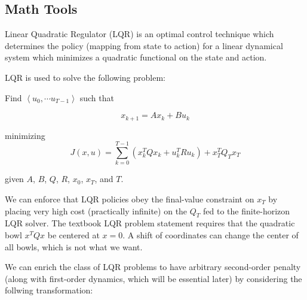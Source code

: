 \documentclass[letterpaper, 10pt, english, conference]{IEEEtran}
\begin{document}
\begin{comment}
\begin{center}
\begin{algorithm}
\For{$x_\mathrm{near} \in X_\mathrm{near}$} {
    $\sigma \leftarrow {\tt LQRSteer}(x_\mathrm{new}, x_\mathrm{near})$ \;
    \If{${\tt Cost}(x_\mathrm{new}) + {\tt Cost}(\sigma) < {\tt Cost}(x_\mathrm{near})$}{
        \If {${\tt CollisionFree}(\sigma)$}{   
            $x_\mathrm{parent} \leftarrow {\tt Parent}(x_\mathrm{near})$\;
            $E \leftarrow E \setminus \{ x_\mathrm{parent}, x_\mathrm{near}\}$\;
            $E \leftarrow E \cup \{ x_\mathrm{new}, x_\mathrm{near}\}$\;
}
    }
}
\Return{$(V,E)$}\;
\caption{${\tt Rewire}( \, (V,E), X_\mathrm{near}, x_\mathrm{new} \, )$}
\end{algorithm}
\end{center}

The changes to the primitives do not logically change the \rrtstar algorithm,
but instead make it easier to plug-in the contributed components.
\end{comment}

\subsection{Math Tools}

Linear Quadratic Regulator (LQR) is an optimal control technique which
determines the policy (mapping from state to action) for a linear
dynamical system which minimizes a quadratic functional on the state
and action.

LQR is used to solve the following problem: 

Find $\left\langle u_{0},\cdots u_{T-1}\right\rangle $ such that 

\[
x_{k+1}=Ax_{k}+Bu_{k}
\]


minimizing 
\[
J\left(x,u\right)=\sum_{k=0}^{T-1}\left(x_{k}^{T}Qx_{k}+u_{k}^{T}Ru_{k}\right)+x_{T}^{T}Q_{T}x_{T}
\]


given $A$, $B$, $Q$, $R$, $x_{0}$, $x_{T}$, and $T$.

We can enforce that LQR policies obey the final-value constraint on
$x_{T}$ by placing very high cost (practically infinite) on the $Q_{T}$
fed to the finite-horizon LQR solver. The textbook LQR problem statement
requires that the quadratic bowl $x^{T}Qx$ be centered at $x=0$.
A shift of coordinates can change the center of all bowls, which is
not what we want.

We can enrich the class of LQR problems to have arbitrary second-order
penalty (along with first-order dynamics, which will be essential
later) by considering the follwing transformation:
\end{document}
